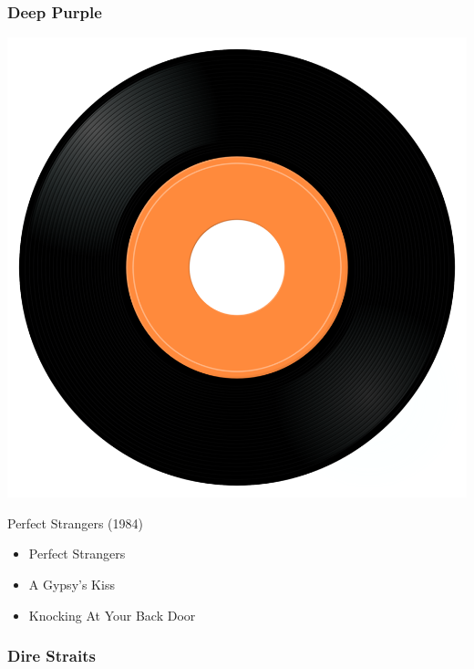 \subsubsection{Deep Purple}

\begin{minipage}[t]{0.25\textwidth}
\captionsetup{type=figure}
\includegraphics[width=\textwidth]{Images/cover.png}
\caption*{Perfect Strangers (1984)}
\end{minipage}
\begin{minipage}[t]{0.25\textwidth}\vspace{0pt}
\begin{itemize}[nosep,leftmargin=1em,labelwidth=*,align=left]
	\setlength{\itemsep}{0pt}
	\item Perfect Strangers 
	\item A Gypsy's Kiss
	\item Knocking At Your Back Door
\end{itemize}
\end{minipage}

\subsubsection{Dire Straits}

